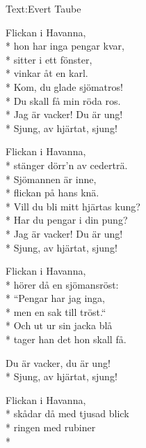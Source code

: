 \begin{SongText}
    \begin{SongInfo}
        Text:Evert Taube
    \end{SongInfo}
    \begin{SongVerse}
        Flickan i Havanna,\\*%
        hon har inga pengar kvar,\\*%
        sitter i ett fönster,\\*%
        vinkar åt en karl.\\*%
        Kom, du glade sjömatros!\\*%
        Du skall få min röda ros.\\*%
        Jag är vacker! Du är ung!\\*%
        Sjung, av hjärtat, sjung!
    \end{SongVerse}
    \begin{SongVerse}
        Flickan i Havanna,\\*%
        stänger dörr’n av cederträ.\\*%
        Sjömannen är inne,\\*%
        flickan på hans knä.\\*%
        Vill du bli mitt hjärtas kung?\\*%
        Har du pengar i din pung?\\*%
        Jag är vacker! Du är ung!\\*%
        Sjung, av hjärtat, sjung!
    \end{SongVerse}
    \begin{SongVerse}
        Flickan i Havanna,\\*%
        hörer då en sjömansröst:\\*%
        “Pengar har jag inga,\\*%
        men en sak till tröst.“\\*%
        Och ut ur sin jacka blå\\*%
        tager han det hon skall få.
    \end{SongVerse}
    \begin{SongVerse}
        Du är vacker, du är ung!\\*%
        Sjung, av hjärtat, sjung!
    \end{SongVerse}
    \begin{SongVerse}
    Flickan i Havanna,\\*%
        skådar då med tjusad blick\\*%
        ringen med rubiner\\*%

\end{SongVerse}
\end{SongText}
